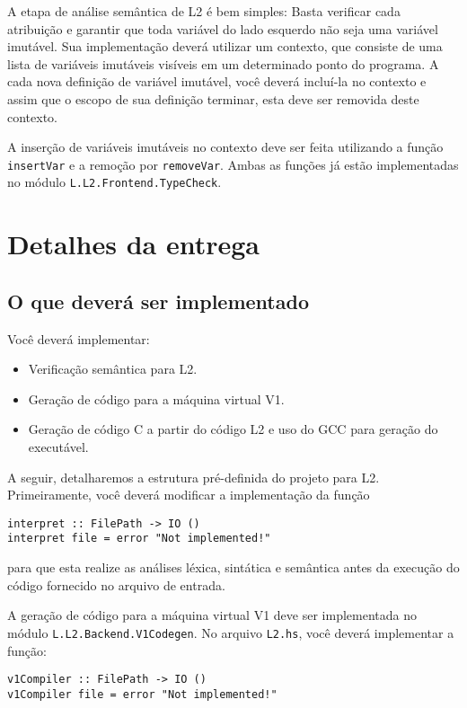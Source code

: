 \documentclass[a4paper,11pt]{article}
\begin{document}
A etapa de análise semântica de L2 é bem simples: Basta verificar cada atribuição e garantir
que toda variável do lado esquerdo não seja uma variável imutável. Sua implementação deverá
utilizar um contexto, que consiste de uma lista de variáveis imutáveis visíveis em um determinado
ponto do programa. A cada nova definição de variável imutável, você deverá incluí-la no contexto e
assim que o escopo de sua definição terminar, esta deve ser removida deste contexto.

A inserção de variáveis imutáveis no contexto deve ser feita utilizando a função \texttt{insertVar} e
a remoção por \texttt{removeVar}. Ambas as funções já estão implementadas no
módulo \texttt{L.L2.Frontend.TypeCheck}.
\section*{Detalhes da entrega}
\label{sec:org546aa3f}

\subsection*{O que deverá ser implementado}
\label{sec:orgf1b1de3}

Você deverá implementar:

\begin{itemize}
\item Verificação semântica para L2.

\item Geração de código para a máquina virtual V1.

\item Geração de código C a partir do código L2 e uso do GCC para geração do executável.
\end{itemize}

A seguir, detalharemos a estrutura pré-definida do projeto para L2.
Primeiramente, você deverá modificar a implementação da função
\begin{verbatim}
interpret :: FilePath -> IO ()
interpret file = error "Not implemented!"
\end{verbatim}
para que esta realize as análises léxica, sintática e semântica antes da
execução do código fornecido no arquivo de entrada.

A geração de código para a máquina virtual V1 deve ser implementada no módulo
\texttt{L.L2.Backend.V1Codegen}. No arquivo \texttt{L2.hs}, você deverá implementar a função:

\begin{verbatim}
v1Compiler :: FilePath -> IO ()
v1Compiler file = error "Not implemented!"
\end{verbatim}
\end{document}
